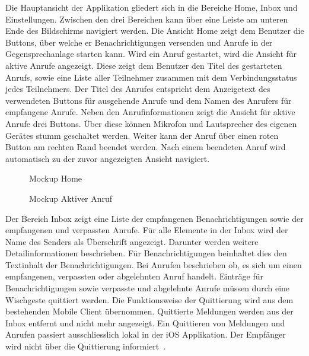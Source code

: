 Die Hauptansicht der Applikation gliedert sich in die Bereiche Home, Inbox und Einstellungen.
Zwischen den drei Bereichen kann über eine Leiste am unteren Ende des Bildschirms navigiert werden.
Die Ansicht Home zeigt dem Benutzer die Buttons, über welche er Benachrichtigungen versenden und Anrufe in der Gegensprechanlage starten kann.
Wird ein Anruf gestartet, wird die Ansicht für aktive Anrufe angezeigt.
Diese zeigt dem Benutzer den Titel des gestarteten Anrufs, sowie eine Liste aller Teilnehmer zusammen mit dem Verbindungsstatus jedes Teilnehmers.
Der Titel des Anrufes entspricht dem Anzeigetext des verwendeten Buttons für ausgehende Anrufe und dem Namen des Anrufers für empfangene Anrufe.
Neben den Anrufinformationen zeigt die Ansicht für aktive Anrufe drei Buttons.
Über diese können Mikrofon und Lautsprecher des eigenen Gerätes stumm geschaltet werden.
Weiter kann der Anruf über einen roten Button am rechten Rand beendet werden.
Nach einem beendeten Anruf wird automatisch zu der zuvor angezeigten Ansicht navigiert.

\begin{figure}[h]
    \centering
    \begin{minipage}[b]{0.4\textwidth}
        \caption{Mockup Home}
    \end{minipage}
    \hfill
    \begin{minipage}[b]{0.4\textwidth}
        \caption{Mockup Aktiver Anruf}
    \end{minipage}\label{fig:Mockups-Home-ActiveCall}
\end{figure}

Der Bereich Inbox zeigt eine Liste der empfangenen Benachrichtigungen sowie der empfangenen und verpassten Anrufe.
Für alle Elemente in der Inbox wird der Name des Senders als Überschrift angezeigt.
Darunter werden weitere Detailinformationen beschrieben.
Für Benachrichtigungen beinhaltet dies den Textinhalt der Benachrichtigungen.
Bei Anrufen beschrieben ob, es sich um einen empfangenen, verpassten oder abgelehnten Anruf handelt.
Einträge für Benachrichtigungen sowie verpasste und abgelehnte Anrufe müssen durch eine Wischgeste quittiert werden.
Die Funktionsweise der Quittierung wird aus dem bestehenden Mobile Client übernommen.
Quittierte Meldungen werden aus der Inbox entfernt und nicht mehr angezeigt.
Ein Quittieren von Meldungen und Anrufen passiert ausschliesslich lokal in der iOS Applikation.
Der Empfänger wird nicht über die Quittierung informiert~\cite{ip5}.

